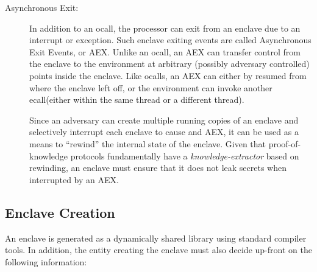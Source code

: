 \documentclass[10pt, letterpaper]{article}
\newcommand{\ecall}{\textsf{ecall}}
\newcommand{\ocall}{\textsf{ocall}}
\begin{document}
\begin{description}
  \item[Asynchronous Exit:] In addition to an \ocall, the processor
    can exit from an enclave due to an interrupt or exception. Such
    enclave exiting events are called Asynchronous Exit Events, or
    AEX. Unlike an \ocall, an AEX can transfer control from the enclave
    to the environment at arbitrary (possibly adversary controlled)
    points inside the enclave. Like \ocall s, an AEX can either by
    resumed from where the enclave left off, or the environment can
    invoke another \ecall (either within the same thread or a
    different thread).

    Since an adversary can create multiple running copies of an
    enclave and selectively interrupt each enclave to cause and AEX,
    it can be used as a means to ``rewind'' the internal state of
    the enclave. Given that proof-of-knowledge \cite{BellarePOK}
    protocols fundamentally have a \textit{knowledge-extractor} based
    on rewinding, an enclave must ensure that it does not leak secrets
    when interrupted by an AEX.

  \end{description}

  \subsection{Enclave Creation}
  \label{sec:enclavecreateion}
  An enclave is generated as a dynamically shared library using
  standard compiler tools. In addition, the entity creating the
  enclave must also decide up-front on the following information:
\end{document}
